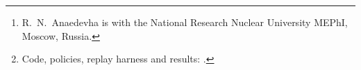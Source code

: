 \documentclass[journal]{IEEEtran}
\begin{document}
\title{\TitleText}

\author{Roger~Nick~Anaedevha%
\thanks{R.~N.~Anaedevha is with the National Research Nuclear University MEPhI, Moscow, Russia.}%
\thanks{Code, policies, replay harness and results: \ArtifactURL.}}


\maketitle


\end{document}
